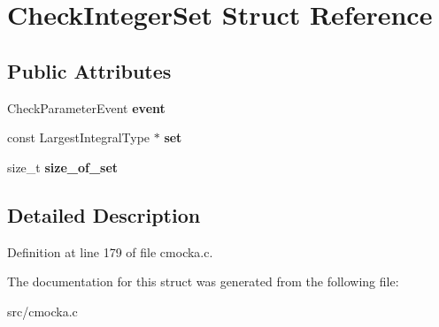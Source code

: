 \hypertarget{structCheckIntegerSet}{}\section{Check\+Integer\+Set Struct Reference}
\label{structCheckIntegerSet}
\subsection*{Public Attributes}
\begin{DoxyCompactItemize}
\item 
\mbox{\label{structCheckIntegerSet_a7153dfb1ec04c0fcacfeb2d60321d4fd}} 
Check\+Parameter\+Event {\bfseries event}
\item 
\mbox{\label{structCheckIntegerSet_a9bb5e12093c709bc42788033506c1c2a}} 
const Largest\+Integral\+Type $\ast$ {\bfseries set}
\item 
\mbox{\label{structCheckIntegerSet_a82dbcbeea43de48060c86d89c6ccc444}} 
size\+\_\+t {\bfseries size\+\_\+of\+\_\+set}
\end{DoxyCompactItemize}


\subsection{Detailed Description}


Definition at line 179 of file cmocka.\+c.



The documentation for this struct was generated from the following file\+:\begin{DoxyCompactItemize}
\item 
src/cmocka.\+c\end{DoxyCompactItemize}
